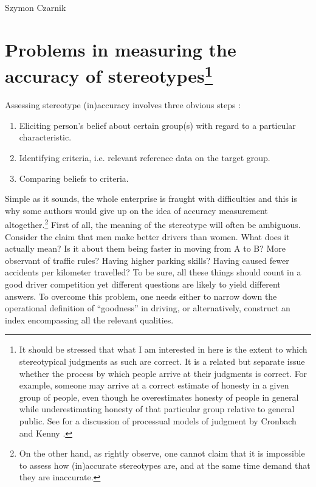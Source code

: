 \begin{artengenv}{Szymon Czarnik}
\enlargethispage{.5\baselineskip}
\section[Problems in measuring the accuracy of stereotypes]{Problems in measuring the accuracy of stereotypes\footnote{It should be stressed that what I am interested in here is the extent to which stereotypical judgments as such are correct. It is a related but separate issue whether the process by which people arrive at their judgments is correct. For example, someone may arrive at a correct estimate of honesty in a given group of people, even though he overestimates honesty of people in general while underestimating honesty of that particular group relative to general public. See
\parencite[][]{jussim_stereotype_2016} %
 for a discussion of processual models of judgment by Cronbach 
\parencite*[][]{cronbach_processes_1955} %
 and Kenny 
\parencite*[][]{kenny_interpersonal_1994}. %
 }}
Assessing stereotype (in)accuracy involves three obvious steps
\parencite[][]{jussim_stereotype_2015}:%


\begin{enumerate}
\item Eliciting person's belief about certain group(s) with regard to a particular characteristic.
\item Identifying criteria, i.e. relevant reference data on the target group.
\item Comparing beliefs to criteria.
\end{enumerate}
Simple as it sounds, the whole enterprise is fraught with difficulties and this is why some authors would give up on the idea of accuracy measurement altogether.\footnote{On the other hand, as
\parencite[][]{jussim_stereotype_2016} %
 rightly observe, one cannot claim that it is impossible to assess how (in)accurate stereotypes are, and at the same time demand that they are inaccurate.} First of all, the meaning of the stereotype will often be ambiguous. Consider the claim that men make better drivers than women. What does it actually mean? Is it about them being faster in moving from A to B? More observant of traffic rules? Having higher parking skills? Having caused fewer accidents per kilometer travelled? To be sure, all these things should count in a good driver competition yet different questions are likely to yield different answers. To overcome this problem, one needs either to narrow down the operational definition of ``goodness'' in driving, or alternatively, construct an index encompassing all the relevant qualities.


\end{artengenv}
